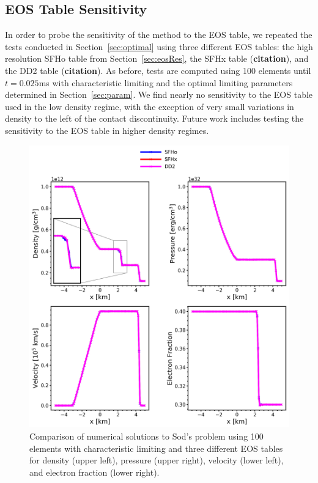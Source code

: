 \documentclass[onecolumn]{aastex62}
\begin{document}
\subsection{EOS Table Sensitivity}
In order to probe the sensitivity of the method to the EOS table, we repeated
the tests conducted in Section~\ref{sec:optimal} using three different EOS tables:
the high resolution SFHo table from Section~\ref{sec:eosRes}, the SFHx table
(\textbf{citation}), and the DD2 table (\textbf{citation}).
As before, tests are computed using 100 elements until
$t = 0.025$ms with characteristic limiting and the optimal limiting parameters determined in
Section~\ref{sec:param}. We find nearly no sensitivity to the EOS table used in
the low density regime, with the exception of very small variations in density
to the left of the contact discontinuity. Future work includes testing the
sensitivity to the EOS table in higher density regimes.
\begin{figure}[h!]
  \centering
  \includegraphics[width=36pc]{./figures/eos_all.png}
  \caption{\label{fig:SodSedovEOS} Comparison of numerical solutions to
  Sod's problem using 100 elements with characteristic limiting and three
  different EOS tables for density (upper left), pressure (upper right),
  velocity (lower left), and electron fraction (lower right).
  }
\end{figure}
\end{document}
